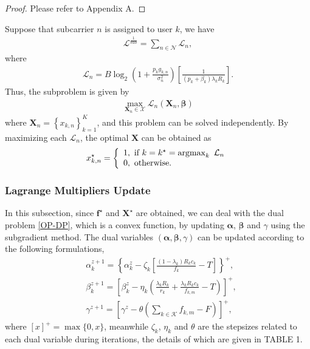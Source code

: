 \documentclass[journal]{IEEEtran}
\begin{document}
\begin{proof}
Please refer to Appendix A.
\end{proof}
Suppose that subcarrier $n$ is assigned to user $k$, we have 
\begin{equation}
\begin{aligned}
\mathcal{L}^{\frac{1}{\text{sub}}} = \sum_{n\in\mathcal{N}}\mathcal{L}_{n},
\end{aligned}
\end{equation}
where 
\begin{equation}
\begin{aligned}
\mathcal{L}_{n} = B\log_2\left(1+\frac{p_{k}g_{k,n}}{\sigma_n^2}\right)\left[\frac{1}{(p_{k}+\beta_{k})\lambda_{k}R_{k}}\right].
\end{aligned}
\end{equation}
Thus, the subproblem is given by
\begin{equation}
\begin{aligned}
\max_{\boldsymbol{X}_{n}\in\mathcal{X}}\mathcal{L}_{n}(\boldsymbol{X}_{n},\boldsymbol\beta) 
\end{aligned}
\end{equation}
where $\boldsymbol X_{n}=\left\{x_{k, n}\right\}_{k=1}^{K}$, and this problem can be solved independently.
By maximizing each $\mathcal{L}_{n}$, the optimal $\boldsymbol X$
can be obtained as
\begin{equation}{\label{op-x}}
x_{k,n}^\star=\left\{\begin{array}{l}{1,~\text {if}~k=k^\star=\operatorname{argmax}_{k}~\mathcal{L}_{n}} \\ {0,
~\text{otherwise}.}\end{array}\right.
\end{equation}
\subsubsection{Lagrange Multipliers Update} In this subsection, since $\boldsymbol{f^\star}$ and $\boldsymbol{X^\star}$ are obtained, we can deal with the dual problem \eqref{OP-DP}, which is a convex function, by updating $\boldsymbol{\alpha}$, $\boldsymbol{\beta}$ and $\gamma$ using the subgradient method.
The dual variables $(\boldsymbol\alpha,\boldsymbol\beta,\gamma)$ can be updated according to the following formulations,
\begin{equation}\label{op-u}
\begin{aligned}
&\alpha_{k}^{z+1}=\left\{\alpha_{k}^{z}-\zeta_{k}\left[ \frac{(1-\lambda_{k})R_{k}c_{k}}{f_{k}}-T\right]\right\}^{+},\\
&\beta_{k}^{z+1}=\left[\beta_{k}^{z}-\eta_{k}\left(\frac{\lambda_{k}R_{k}}{r_{k}}+\frac{\lambda_{k}R_{k}c_{k}}{f_{k,m}}-T \right)\right]^{+},\\
&\gamma^{z+1}=\left[\gamma^{z}-\theta\left(\sum_{k\in\mathcal{K}}f_{k,m} - F\right)\right]^{+},
\end{aligned}
\end{equation}
where $[x]^{+} = \max\{0,x\}$, meanwhile $\zeta_k$, $\eta_k$ and $\theta$ are the stepsizes related to each dual variable during iterations, the details of which are given in TABLE 1.
\end{document}
